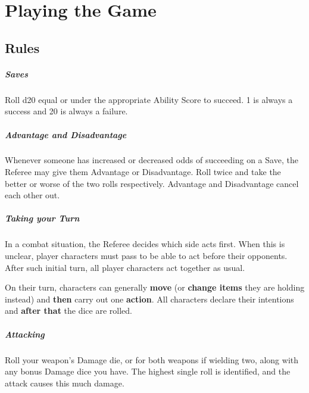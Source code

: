 \documentclass[itdr]{subfiles}
\begin{document}
\cleartoleftpage

\chapter{Playing the Game}
\label{ch:playing_the_game}

\section{Rules}

\paragraph{Saves}
Roll d20 equal or under the appropriate Ability Score to succeed. 1 is always a success and 20 is \mbox{always} a failure.

\vfill

\paragraph{Advantage and Disadvantage}
Whenever someone has increased or decreased odds of succeeding on a Save, the Referee may give them Advantage or Disadvantage. Roll twice and take the better or worse of the two rolls respectively. Advantage and Disadvantage cancel each other out.

\vfill

\paragraph{Taking your Turn}
In a combat situation, the Referee decides which side acts first. When this is unclear, player characters must pass  to be able to act before their opponents. After such initial turn, all player characters act together as usual.

On their turn, characters can generally \textbf{move} (or \textbf{change items} they are holding instead) and \textbf{then} carry out one \textbf{action}. All characters declare their \mbox{intentions} and \textbf{after that} the dice are rolled.

\vfill

\paragraph{Attacking}
Roll your weapon's Damage die, or for both weapons if wielding two, along with any bonus Damage dice you have. The highest single roll is identified, and the attack causes this much damage.
\end{document}
